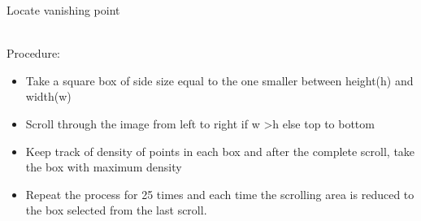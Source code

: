 \documentclass[8pt]{beamer}
\begin{document}
{{

\begin{frame}{Locate vanishing point}

{ }\\[5pt]

Procedure:\\[5pt]
\begin{itemize}
\setlength\itemsep{1em}
\item Take a square box of side size equal to the one smaller between height(h) and width(w)
 \item Scroll through the image from left to right if w \textgreater h else top to bottom
 \item Keep track of density of points in each box and after the complete scroll, take the box with maximum density
 \item Repeat the process for 25 times and each time the scrolling area is reduced to the box selected from the last scroll.
\end{itemize}

\end{frame}}}
\end{document}
